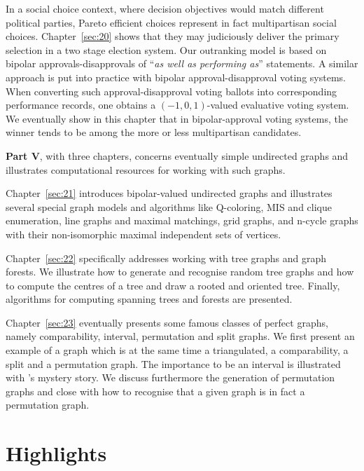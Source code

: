 In a social choice context, where decision objectives would match different political parties, Pareto efficient choices represent in fact multipartisan social choices. Chapter~\vref{sec:20} shows that they may judiciously deliver the primary selection in a two stage election system. Our outranking model is based on bipolar approvals-disapprovals of ``\emph{as well as performing as}'' statements. A similar approach is put into practice with bipolar approval-disapproval voting systems. When converting such approval-disapproval voting ballots into corresponding performance records, one obtains a $(-1,0,1)$-valued evaluative voting system. We eventually show in this chapter that in bipolar-approval voting systems, the winner tends to be among the more or less multipartisan candidates.
\vspace{0.5cm}

\textbf{Part V}, with three chapters, concerns eventually simple undirected graphs and illustrates computational resources for working with such graphs.

Chapter~\vref{sec:21} introduces bipolar-valued undirected graphs and illustrates several special graph models and algorithms like Q-coloring, MIS and clique enumeration, line graphs and maximal matchings, grid graphs, and n-cycle graphs with their non-isomorphic maximal independent sets of vertices.

Chapter~\vref{sec:22} specifically addresses working with tree graphs and graph forests. We illustrate how to generate and recognise random tree graphs and how to compute the centres of a tree and draw a rooted and oriented tree. Finally, algorithms for computing spanning trees and forests are presented.

Chapter~\vref{sec:23} eventually presents some famous classes of perfect graphs, namely comparability, interval, permutation and split graphs. We first present an example of a graph which is at the same time a triangulated, a comparability, a split and a permutation graph. The importance to be an interval is illustrated with \Berge ’s mystery story. We discuss furthermore the generation of permutation graphs and close with how to recognise that a given graph is in fact a permutation graph.

{}
\section*{Highlights}
\label{sec:0.3}

